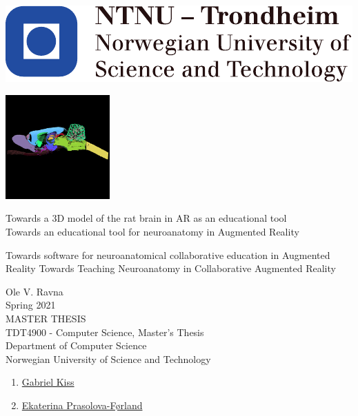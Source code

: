 
\thispagestyle{empty}
\includegraphics[scale=1.1]{fig/NTNU}
\mbox{}\\[3pc]
\begin{center}

\includegraphics[width=0.3\textwidth]{fig/nevrolens_icon}

\Huge{Towards a 3D model of the rat brain in AR as an educational tool}\\[2pc]

Towards an educational tool for neuroanatomy in Augmented Reality

Towards software for neuroanatomical collaborative education in Augmented Reality
Towards Teaching Neuroanatomy in Collaborative Augmented Reality

\Large{Ole V. Ravna}\\[1pc]
\large{Spring 2021}\\[2pc]

MASTER THESIS\\
TDT4900 - Computer Science, Master's Thesis\\
Department of Computer Science\\
Norwegian University of Science and Technology
\end{center}
\vfill


\begin{enumerate}[label={Supervisor \arabic*:}]
    \item \href{https://www.ntnu.no/ansatte/gabriel.kiss}{Gabriel Kiss}
    \item \href{https://www.ntnu.no/ansatte/ekaterip}{Ekaterina Prasolova-Førland}
\end{enumerate}


